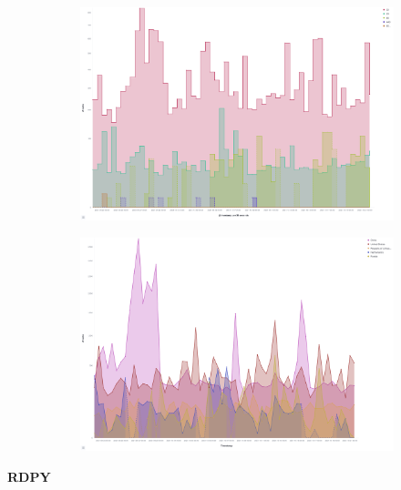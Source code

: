 \begin{figure}
    \centering
   
    \begin{subfigure}[b]{0.49\textwidth}
        \centering
        \includegraphics[width=\textwidth]{figures/tpot-cowire-attacks.png}
        \caption{}
        \label{fig:tpot-cowire-attacks}
    \end{subfigure}
    \hfill
    \begin{subfigure}[b]{0.49\textwidth}
        \centering
        \includegraphics[width=\textwidth]{figures/tpot-cowire-country.png}
        \caption{}
        \label{fig:tpot-cowire-country}
    \end{subfigure}
    \caption[]{}
    \label{fig:cowire}
\end{figure}

\textbf{RDPY}


